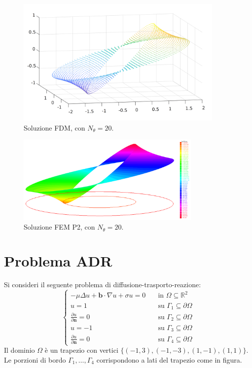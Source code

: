 \documentclass[a4paper]{article}
\renewcommand{\vec}[1]{\mathbf{#1}}
\begin{document}
\begin{figure}
\centering
\includegraphics[width=0.9\textwidth]{figures/solution_FD_20.png}
\caption{Soluzione FDM, con $N_\theta = 20$.}
\label{fig:pb1-solution-FD-20}
\end{figure}

\begin{figure}
\centering
\includegraphics[width=0.8\textwidth]{figures/solution_FE_20.png}
\caption{Soluzione FEM P2, con $N_\theta = 20$.}
\label{fig:pb1-solution-FE-20}
\end{figure}

\clearpage

\section{Problema ADR}
Si consideri il seguente problema di diffusione-trasporto-reazione:
\begin{equation} \label{eqn:ADR-strong}
\begin{cases}
- \mu \Delta u + \vec{b} \cdot \nabla u + \sigma u = 0
\quad & \text{in $\Omega \subseteq \mathbb{R}^2$} \\
u = 1 \quad & \text{su $\Gamma_1 \subseteq \partial \Omega$} \\
\frac{\partial u}{\partial \vec{n}} = 0 \quad & \text{su $\Gamma_2 \subseteq \partial \Omega$} \\
u = -1 \quad & \text{su $\Gamma_3 \subseteq \partial \Omega$} \\
\frac{\partial u}{\partial \vec{n}} = 0 \quad & \text{su $\Gamma_4 \subseteq \partial \Omega$}
\end{cases}
\end{equation}
Il dominio $\Omega$ è un trapezio con vertici $\{(-1,3),(-1,-3),(1,-1),(1,1)\}$.
Le porzioni di bordo $\Gamma_1,\dots,\Gamma_4$ corrispondono a lati del trapezio
come in figura. \vspace{6pt}
\end{document}
